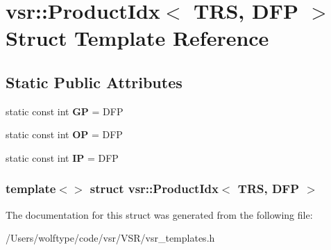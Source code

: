 \hypertarget{structvsr_1_1_product_idx_3_01_t_r_s_00_01_d_f_p_01_4}{\section{vsr\-:\-:Product\-Idx$<$ T\-R\-S, D\-F\-P $>$ Struct Template Reference}
\label{structvsr_1_1_product_idx_3_01_t_r_s_00_01_d_f_p_01_4}
}
\subsection*{Static Public Attributes}
\begin{DoxyCompactItemize}
\item 
\hypertarget{structvsr_1_1_product_idx_3_01_t_r_s_00_01_d_f_p_01_4_ad8a238a89293eb128425a4275505b119}{static const int {\bfseries G\-P} = D\-F\-P}\label{structvsr_1_1_product_idx_3_01_t_r_s_00_01_d_f_p_01_4_ad8a238a89293eb128425a4275505b119}

\item 
\hypertarget{structvsr_1_1_product_idx_3_01_t_r_s_00_01_d_f_p_01_4_a03f3b294a1ec9baef577f767977f842c}{static const int {\bfseries O\-P} = D\-F\-P}\label{structvsr_1_1_product_idx_3_01_t_r_s_00_01_d_f_p_01_4_a03f3b294a1ec9baef577f767977f842c}

\item 
\hypertarget{structvsr_1_1_product_idx_3_01_t_r_s_00_01_d_f_p_01_4_a0fee4d211cc521a224efb8f963f9bad2}{static const int {\bfseries I\-P} = D\-F\-P}\label{structvsr_1_1_product_idx_3_01_t_r_s_00_01_d_f_p_01_4_a0fee4d211cc521a224efb8f963f9bad2}

\end{DoxyCompactItemize}
\subsubsection*{template$<$$>$ struct vsr\-::\-Product\-Idx$<$ T\-R\-S, D\-F\-P $>$}



The documentation for this struct was generated from the following file\-:\begin{DoxyCompactItemize}
\item 
/\-Users/wolftype/code/vsr/\-V\-S\-R/vsr\-\_\-templates.\-h\end{DoxyCompactItemize}
